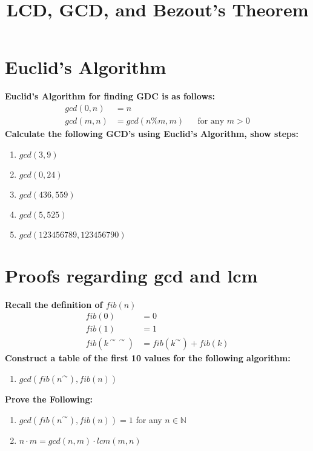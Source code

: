 \documentclass[12pt]{article}
\date{}
\author{}
\title{LCD, GCD, and Bezout's Theorem}
\begin{document}
	\maketitle
	\section{Euclid's Algorithm}
	\textbf{Euclid's Algorithm for finding GDC is as follows:}
	\begin{align*}
	gcd(0,n)&=n\\
	gcd(m,n)&=gcd(n\%m,m) &&\text{for any $m>0$}
	\end{align*}
	\textbf{Calculate the following GCD's using Euclid's Algorithm, show steps:}
	\begin{enumerate}
		\item $gcd(3,9)$
		\item $gcd(0,24)$
		\item $gcd(436,559)$
		\item $gcd(5,525)$
		\item $gcd(123456789,123456790)$
	\end{enumerate}
	\section{Proofs regarding gcd and lcm}
	\textbf{Recall the definition of $fib(n)$}
	\begin{align*}
		fib(0)&=0\\
		fib(1)&=1\\
		fib(k^{\curvearrowright \curvearrowright})&=fib(k^\curvearrowright)+fib(k)
	\end{align*}
	\textbf{Construct a table of the first 10 values for the following algorithm:}
	\begin{enumerate}[resume]
		\item$gcd(fib(n^\curvearrowright),fib(n))$ 
	\end{enumerate}
	\textbf{Prove the Following:}
	\begin{enumerate}[resume]
		\item $gcd(fib(n^\curvearrowright),fib(n))=1$ for any $n\in\mathbb{N}$
		\item $n \cdot m = gcd(n,m)\cdot lcm(m,n)$
	\end{enumerate}
\end{document}
